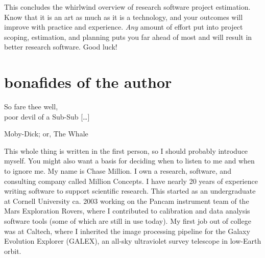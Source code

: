 \documentclass[12pt,oneside]{book}
\begin{document}
\vfill
This concludes the whirlwind overview of research software project estimation. Know that it is an art as much as it is a technology, and your outcomes will improve with practice and experience. \emph{Any} amount of effort put into project scoping, estimation, and planning puts you far ahead of most and will result in better research software. Good luck!
\hfill \break \hfill \break \hfill \break

\chapter*{bonafides of the author}

\epigraph{So fare thee well, \\poor devil of a Sub-Sub [{\dots}]}{Moby-Dick; or, The Whale} \hfill \break

This whole thing is written in the first person, so I should probably introduce myself. You might also want a basis for deciding when to listen to me and when to ignore me. My name is Chase Million. I own a research, software, and consulting company called Million Concepts. I have nearly 20 years of experience writing software to support scientific research. This started as an undergraduate at Cornell University ca. 2003 working on the Pancam instrument team of the Mars Exploration Rovers, where I contributed to calibration and data analysis software tools (some of which are still in use today). My first job out of college was at Caltech, where I inherited the image processing pipeline for the Galaxy Evolution Explorer (GALEX), an all-sky ultraviolet survey telescope in low-Earth orbit.
\end{document}
